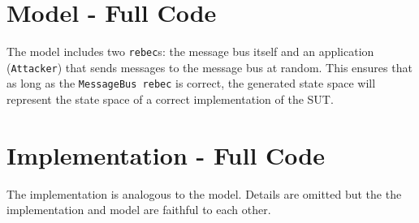 \documentclass{article}
\begin{document}
\newpage


\newpage
\begin{appendices}

\section{\Rebeca Model - Full Code}



The \Rebeca model includes two \texttt{rebec}s: the message bus itself and an application (\texttt{Attacker}) that sends messages to the message bus at random. This ensures that as long as the \texttt{MessageBus rebec} is correct, the generated state space will represent the state space of a correct implementation of the SUT.

\newpage
\section{Implementation - Full Code}



The implementation is analogous to the \Rebeca model. Details are omitted but the the implementation and model are faithful to each other. 

%
%
%
%
%

\end{appendices}
\end{document}
